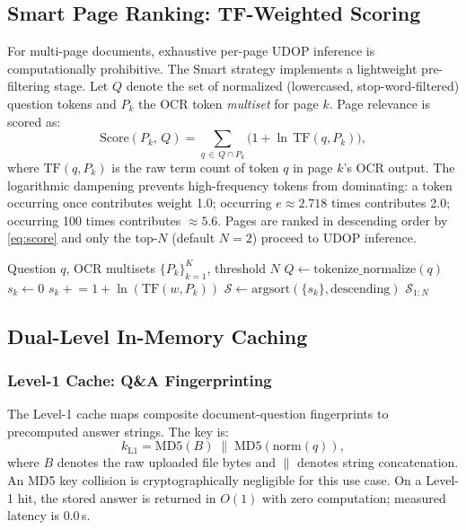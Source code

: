 \documentclass[conference]{IEEEtran}
\begin{document}
\subsection{Smart Page Ranking: TF-Weighted Scoring}
\label{subsec:smart}

For multi-page documents, exhaustive per-page UDOP inference is
computationally prohibitive. The Smart strategy implements a lightweight
pre-filtering stage. Let $Q$ denote the set of normalized (lowercased,
stop-word-filtered) question tokens and $P_k$ the OCR token \emph{multiset}
for page $k$. Page relevance is scored as:
\begin{equation}
    \text{Score}(P_k,\, Q)
    = \sum_{q\,\in\, Q \cap P_k} \bigl(1 + \ln\, \text{TF}(q, P_k)\bigr),
    \label{eq:score}
\end{equation}
where $\text{TF}(q, P_k)$ is the raw term count of token $q$ in page $k$'s
OCR output. The logarithmic dampening prevents high-frequency tokens from
dominating: a token occurring once contributes weight 1.0; occurring
$e{\approx}2.718$ times contributes 2.0; occurring 100 times contributes
${\approx}5.6$. Pages are ranked in descending order by
\eqref{eq:score} and only the top-$N$ (default $N{=}2$) proceed to UDOP
inference.

\begin{algorithm}[t]
\caption{Smart Page Ranking}
\label{alg:smart}
\begin{algorithmic}[1]
\REQUIRE Question $q$, OCR multisets $\{P_k\}_{k=1}^K$, threshold $N$
\STATE $Q \leftarrow \text{tokenize\_normalize}(q)$
    \STATE $s_k \leftarrow 0$
        \STATE $s_k \mathrel{+}= 1 + \ln(\text{TF}(w, P_k))$
    \ENDFOR
\ENDFOR
\STATE $\mathcal{S} \leftarrow \text{argsort}(\{s_k\}, \text{descending})$
\RETURN $\mathcal{S}_{1:N}$
\end{algorithmic}
\end{algorithm}

\subsection{Dual-Level In-Memory Caching}
\label{subsec:cache}

\subsubsection{Level-1 Cache: Q\&A Fingerprinting}

The Level-1 cache maps composite document-question fingerprints to precomputed
answer strings. The key is:
\begin{equation}
    k_{\text{L1}} = \text{MD5}(B) \;\|\; \text{MD5}(\text{norm}(q)),
    \label{eq:l1key}
\end{equation}
where $B$ denotes the raw uploaded file bytes and $\|$ denotes string
concatenation. An MD5 key collision is cryptographically negligible for this
use case. On a Level-1 hit, the stored answer is returned in $O(1)$ with
zero computation; measured latency is 0.0\,s.
\end{document}
